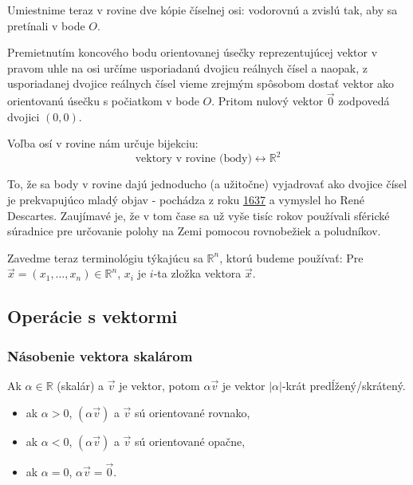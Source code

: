 \documentclass[11pt]{article}
\renewcommand{\vec}[1]{\overrightarrow{#1}}
\newcommand{\R}{\mathbb{R}}
\begin{document}
Umiestnime teraz v rovine dve kópie číselnej osi: vodorovnú a zvislú tak, aby sa pretínali v bode $O$.
\begin{center}
\end{center}
Premietnutím koncového bodu orientovanej úsečky reprezentujúcej vektor v pravom uhle na osi určíme usporiadanú dvojicu reálnych čísel a naopak, z usporiadanej dvojice reálnych čísel vieme zrejmým spôsobom dostať vektor ako orientovanú úsečku s počiatkom v bode $O$. Pritom nulový vektor $\vec{0}$ zodpovedá dvojici $(0,0)$.

Voľba osí v rovine nám určuje bijekciu:
$$ \text{vektory v rovine (body)} \longleftrightarrow \R^2 $$

To, že sa body v rovine dajú jednoducho (a užitočne) vyjadrovať ako dvojice čísel je prekvapujúco mladý objav - pochádza z roku \underline{1637} a vymyslel ho René Descartes. Zaujímavé je, že v tom čase sa už vyše tisíc rokov používali sférické súradnice pre určovanie polohy na Zemi pomocou rovnobežiek a poludníkov.

Zavedme teraz terminológiu týkajúcu sa $\R^n$, ktorú budeme používať:
Pre $\vec{x}=(x_1, \dots, x_n) \in \R^n$, $x_i$ je $i$-ta zložka vektora $\vec{x}$.

\hrulefill

\subsection{Operácie s vektormi}

\subsubsection{Násobenie vektora skalárom}
Ak $\alpha \in \R$ (skalár) a $\vec{v}$ je vektor, potom $\alpha\vec{v}$ je vektor $|\alpha|$-krát predĺžený/skrátený.
\begin{itemize}
    \item ak $\alpha > 0$, $(\alpha\vec{v})$ a $\vec{v}$ sú orientované rovnako,
    \item ak $\alpha < 0$, $(\alpha\vec{v})$ a $\vec{v}$ sú orientované opačne,
    \item ak $\alpha=0$, $\alpha\vec{v} = \vec{0}$.
\end{itemize}
\end{document}
